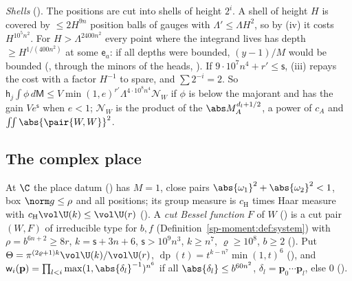 \emph{Shells} (). The positions are cut into shells of
height $2^i$. A shell of height $H$ is covered by $\le2H^{9n}$ position balls of gauges with
$\Lambda'\le\Lambda H^2$, so by (iv) it costs $H^{10^5n^2}$. For $H>\Lambda^{2400n^2}$ every point
where the integrand lives has depth $\ge H^{1/(400n^2)}$ at some $\mathsf e_a$: if all depths were bounded,
$(y-1)/M$ would be bounded (, through
the minors of the heads, ). If $9\cdot10^7n^4+r'\le\mathsf s$, (iii)
repays the cost with a factor $H^{-1}$ to spare, and $\sum2^{-i}=2$. So
$\mathsf h_j\int\phi\,d\mathsf M\le V\min(1,e)^{r'}\Lambda^{4\cdot10^8n^4}\mathcal N_W$ if $\phi$ is below the
majorant and has the gain $Ve^{\mathsf s}$ when $e<1$; $\mathcal N_W$ is the product of the
$\abs M_A^{d_l+1/2}$, a power of $c_A$ and $\iint\abs{\pair{W,W}}^2$.

\subsection{The complex place}\label{sp-frames:ss:real}

At $\C$ the place datum () has $M=1$, close pairs
$\abs{\omega_1}^2+\abs{\omega_2}^2<1$, box $\norm g\le\rho$ and all positions; its group measure is
$c_{\mathrm H}$ times Haar measure with $c_{\mathrm H}\vol\U(k)\le\vol\U(r)$
(). A \emph{cut Bessel
function} $F$ of $W$ () is a cut pair $(W,F)$ of irreducible type for
$b,f$ (Definition~\ref{sp-moment:def:system}) with $\rho=b^{6n+2}\ge8r$, $k=\mathsf s+3n+6$,
$\mathsf s>10^9n^3$, $k\ge n^7$, $\varrho\ge10^8$, $b\ge2$ (). Put
$\Theta=\pi^{(2\varrho+1)k}\vol\U(k)/\vol\U(r)$, $\operatorname{dp}(t)=t^{k-n^7}\min(1,t)^6$ (), and
$\mathsf w_i(\mathbf p)=\prod_{l<i}\max(1,\abs{\delta_l}^{-1})^{n^6}$ if all $\abs{\delta_l}\le b^{60n^2}$,
$\delta_l=\mathbf p_0\cdots\mathbf p_l$, else $0$ ().

